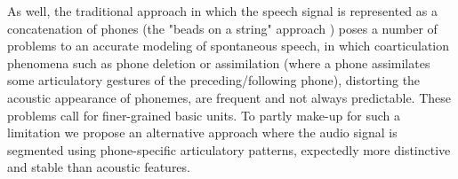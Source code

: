 As well, the traditional approach in which the speech signal is represented as a concatenation of phones 
(the "beads on a string" approach \cite{ostendorf}) poses a number of problems to an accurate modeling of
spontaneous speech, in which coarticulation phenomena such as phone deletion or assimilation (where a phone assimilates some articulatory gestures of the preceding/following phone),
distorting the acoustic appearance of phonemes, are frequent and not always predictable. These problems
call for finer-grained basic units. To partly make-up for such a limitation we propose
an alternative approach where the audio signal is segmented using phone-specific articulatory patterns,
expectedly more distinctive and stable than acoustic features.



